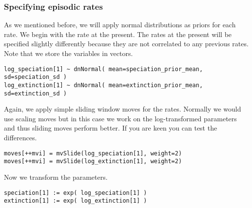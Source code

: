 \subsubsection{Specifying episodic rates}
As we mentioned before, we will apply normal distributions as priors for each rate.
We begin with the rate at the present.
The rates at the present will be specified slightly differently because they are not correlated to any previous rates.
Note that we store the variables in vectors.
{\tt \begin{snugshade*}
\begin{lstlisting}
log_speciation[1] ~ dnNormal( mean=speciation_prior_mean, sd=speciation_sd )
log_extinction[1] ~ dnNormal( mean=extinction_prior_mean, sd=extinction_sd )
\end{lstlisting}
\end{snugshade*}}
Again, we apply simple sliding window moves for the rates.
Normally we would use scaling moves but in this case we work on the log-transformed parameters and thus sliding moves perform better.
If you are keen you can test the differences.
{\tt \begin{snugshade*}
\begin{lstlisting}
moves[++mvi] = mvSlide(log_speciation[1], weight=2)
moves[++mvi] = mvSlide(log_extinction[1], weight=2)
\end{lstlisting}
\end{snugshade*}}
Now we transform the parameters.
{\tt \begin{snugshade*}
\begin{lstlisting}
speciation[1] := exp( log_speciation[1] )
extinction[1] := exp( log_extinction[1] )
\end{lstlisting}
\end{snugshade*}}

